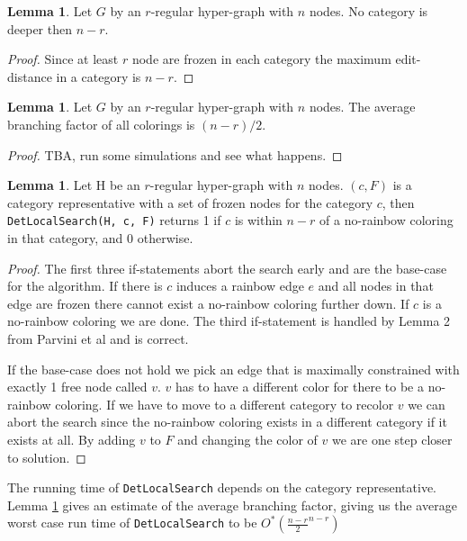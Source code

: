 \documentclass{book}
\theoremstyle{definition}
\newtheorem{lemma}[theorem]{Lemma}
\begin{document}
\begin{lemma}
  Let $G$ by an $r$-regular hyper-graph with $n$ nodes. No category is deeper then $n - r$.
\end{lemma}
\begin{proof}
  Since at least $r$ node are frozen in each category the maximum edit-distance in a category is $n - r$.
\end{proof}

\begin{lemma} \label{lemma:fazter}
  Let $G$ by an $r$-regular hyper-graph with $n$ nodes. The average branching factor of all colorings is $(n - r) / 2$.
\end{lemma}
\begin{proof}
  TBA, run some simulations and see what happens.
\end{proof}


\begin{lemma}
  Let H be an $r$-regular hyper-graph with $n$ nodes. $(c, F)$ is a category representative with a set of frozen nodes for the category $c$, then \texttt{DetLocalSearch(H, c, F)} returns 1 if $c$ is within $n - r$ of a no-rainbow coloring in that category, and 0 otherwise.
\end{lemma}
\begin{proof}
  The first three if-statements abort the search early and are the base-case for the algorithm. If there is $c$ induces a rainbow edge $e$ and all nodes in that edge are frozen there cannot exist a no-rainbow coloring further down. If $c$ is a no-rainbow coloring we are done. The third if-statement is handled by Lemma 2 from Parvini et al and is correct.

  If the base-case does not hold we pick an edge that is maximally constrained with exactly 1 free node called $v$. $v$ has to have a different color for there to be a no-rainbow coloring. If we have to move to a different category to recolor $v$ we can abort the search since the no-rainbow coloring exists in a different category if it exists at all. By adding $v$ to $F$ and  changing the color of $v$ we are one step closer to solution.
\end{proof}

The running time of \texttt{DetLocalSearch} depends on the category representative. Lemma \ref{lemma:fazter} gives an estimate of the average branching factor, giving us the average worst case run time of \texttt{DetLocalSearch} to be $O^*(\frac{n - r}{2}^{n - r})$


\end{document}
